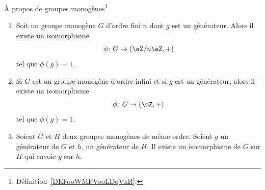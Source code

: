 \begin{lemma}   \label{LemZhxMit}

    À propos de groupes monogènes\footnote{Définition~\ref{DEFooWMFVooLDqVxR}.}

    \begin{enumerate}
        \item


    Soit un groupe monogène \( G\) d'ordre fini \( n\) dont \( g\) est un générateur. Alors il existe un isomorphisme
    \begin{equation}
        \phi\colon G\to (\eZ/n\eZ,+)
    \end{equation}
    tel que \( \phi(g)=1\).

\item

    Si \( G\) est un groupe monogène d'ordre infini et si \( g\) est un générateur, alors il existe un isomorphisme
    \begin{equation}
        \phi\colon G\to (\eZ,+)
    \end{equation}
    tel que \( \phi(g)=1\).

   \item

    Soient \( G\) et \( H\) deux groupes monogènes de même ordre. Soient \( g\) un générateur de \( G\) et \( h\), un générateur de \( H\). Il existe un isomorphisme de \( G\) sur \( H\) qui envoie \( g\) sur \( h\).
    \end{enumerate}
\end{lemma}

